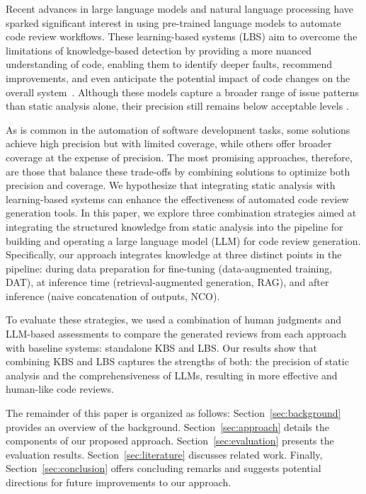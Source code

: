 Recent advances in large language models and natural language processing have sparked significant interest in using pre-trained language models to automate code review workflows. These learning-based systems (LBS) aim to overcome the limitations of knowledge-based detection by providing a more nuanced understanding of code, enabling them to identify deeper faults, recommend improvements, and even anticipate the potential impact of code changes on the overall system~\cite{wadhwa2024core}. Although these models capture a broader range of issue patterns than static analysis alone, their precision still remains below acceptable levels \cite{tufano2024code, ibtasham2024towards}.

As is common in the automation of software development tasks, some solutions achieve high precision but with limited coverage, while others offer broader coverage at the expense of precision. The most promising approaches, therefore, are those that balance these trade-offs by combining solutions to optimize both precision and coverage. We hypothesize that integrating static analysis with learning-based systems can enhance the effectiveness of automated code review generation tools.
In this paper, we explore three combination strategies aimed at integrating the structured knowledge from static analysis into the pipeline for building and operating a large language model (LLM) for code review generation. Specifically, our approach integrates knowledge at three distinct points in the pipeline: during data preparation for fine-tuning (data-augmented training, DAT), at inference time (retrieval-augmented generation, RAG), and after inference (naive concatenation of outputs, NCO).

To evaluate these strategies, we used a combination of human judgments and LLM-based assessments to compare the generated reviews from each approach with baseline systems: standalone KBS and LBS. Our results show that combining KBS and LBS captures the strengths of both: the precision of static analysis and the comprehensiveness of LLMs, resulting in more effective and human-like code reviews.

The remainder of this paper is organized as follows: Section~\ref{sec:background} provides an overview of the background. Section~\ref{sec:approach} details the components of our proposed approach. Section~\ref{sec:evaluation} presents the evaluation results. Section~\ref{sec:literature} discusses related work. Finally, Section~\ref{sec:conclusion} offers concluding remarks and suggests potential directions for future improvements to our approach.

